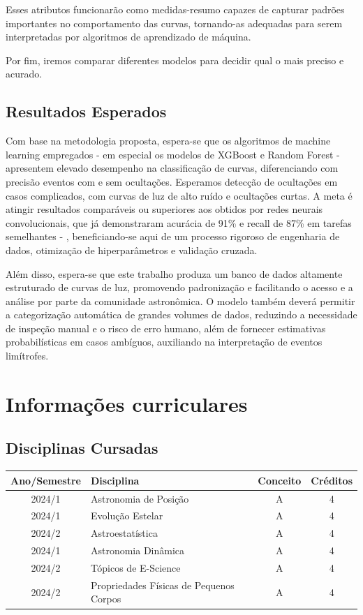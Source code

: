 \documentclass[12pt]{article}
\numberwithin{equation}{section}
\begin{document}
Esses atributos funcionarão como medidas-resumo capazes de capturar padrões importantes no comportamento das curvas, tornando-as adequadas para serem interpretadas por algoritmos de aprendizado de máquina. 

Por fim, iremos comparar diferentes modelos para decidir qual o mais preciso e acurado.

\subsection{Resultados Esperados}
\indent
Com base na metodologia proposta, espera-se que os algoritmos de machine learning empregados - em especial os modelos de XGBoost e Random Forest - apresentem elevado desempenho na classificação de curvas, diferenciando com precisão eventos com e sem ocultações. Esperamos detecção de ocultações em casos complicados, com curvas de luz de alto ruído e ocultações curtas. A meta é atingir resultados comparáveis ou superiores aos obtidos por redes neurais convolucionais, que já demonstraram acurácia de 91\% e recall de 87\% em tarefas semelhantes - \cite{Cazeneuve_2023}, beneficiando-se aqui de um processo rigoroso de engenharia de dados, otimização de hiperparâmetros e validação cruzada. 

Além disso, espera-se que este trabalho produza um banco de dados altamente estruturado de curvas de luz, promovendo padronização e facilitando o acesso e a análise por parte da comunidade astronômica. O modelo também deverá permitir a categorização automática de grandes volumes de dados, reduzindo a necessidade de inspeção manual e o risco de erro humano, além de fornecer estimativas probabilísticas em casos ambíguos, auxiliando na interpretação de eventos limítrofes.

\section{\sc Informações curriculares}


\subsection{Disciplinas Cursadas}

{\small
\begin{tabular}{|c|l|c|c|}
\hline
Ano/Semestre & Disciplina & Conceito & Créditos \\
\hline
2024/1       & Astronomia de Posição    & A & 4  \\
2024/1       & Evolução Estelar	& A & 4  \\
2024/2       & Astroestatística         & A & 4  \\
2024/1       & Astronomia Dinâmica      & A & 4  \\
2024/2       & Tópicos de E-Science     & A & 4  \\
2024/2       & Propriedades Físicas de Pequenos Corpos & A & 4 \\

\hline
\hline
\end{tabular}
}
\end{document}
